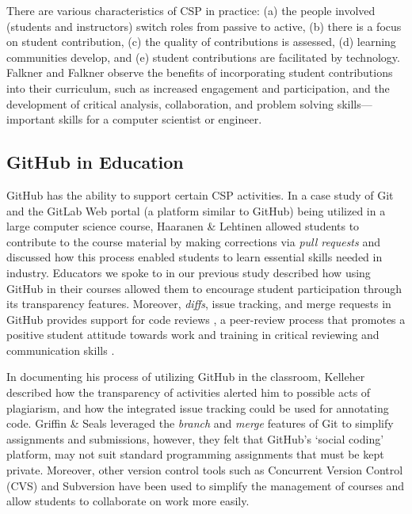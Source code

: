 There are various characteristics of CSP in practice: (a) the people involved (students and instructors) switch roles from passive to active, (b) there is a focus on student contribution, (c) the quality of contributions is assessed, (d) learning communities develop, and (e) student contributions are facilitated by technology. Falkner and Falkner \cite{falkner2012supporting} observe the benefits of incorporating student contributions into their curriculum, such as increased engagement and participation, and the development of critical analysis, collaboration, and problem solving skills---important skills for a computer scientist or engineer.

\subsection{GitHub in Education}
GitHub has the ability to support certain CSP activities. In a case study of Git and the GitLab Web portal (a platform similar to GitHub) being utilized in a large computer science course, Haaranen \& Lehtinen \cite{haaranen2015teaching} allowed students to contribute to the course material by making corrections via \emph{pull requests} and discussed how this process enabled students to learn essential skills needed in industry. Educators we spoke to in our previous study \cite{zagalsky2015emergence} described how using GitHub in their courses allowed them to encourage student participation through its transparency features. Moreover, \emph{diffs}, issue tracking, and merge requests in GitHub provides support for code reviews \cite{kalliamvakou2014promises}, a peer-review process that promotes a positive student attitude towards work and training in critical reviewing and communication skills \cite{hundhausen2013talking}.

In documenting his process of utilizing GitHub in the classroom, Kelleher \cite{kelleher2014employing} described how the transparency of activities alerted him to possible acts of plagiarism, and how the integrated issue tracking could be used for annotating code. Griffin \& Seals \cite{griffin2013github} leveraged the \emph{branch} and \emph{merge} features of Git to simplify assignments and submissions, however, they felt that GitHub's `social coding' platform, may not suit standard programming assignments that must be kept private. Moreover, other version control tools such as Concurrent Version Control (CVS) \cite{reid2005learning} and Subversion \cite{clifton2007subverting} have been used to simplify the management of courses and allow students to collaborate on work more easily.

